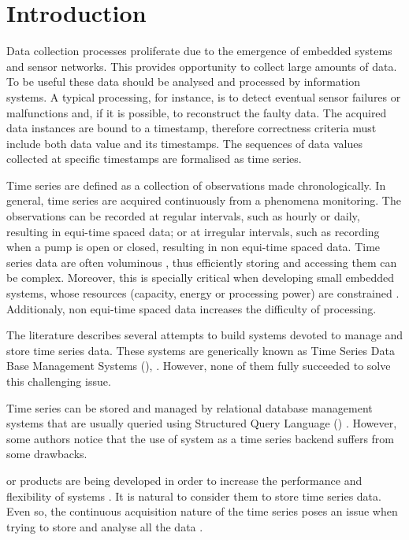 \section{Introduction}

Data collection processes proliferate due to the emergence of embedded
systems and sensor networks.  This provides opportunity to collect
large amounts of data. To be useful these data should be analysed and
processed by information systems. A typical processing, for instance,
is to detect eventual sensor failures or malfunctions and, if it is
possible, to reconstruct the faulty data. The acquired data instances
are bound to a timestamp, therefore correctness criteria must include
both data value and its timestamps. The sequences of data values
collected at specific timestamps are formalised as time series.

Time series are defined as a collection of observations made
chronologically.  In general, time series are acquired continuously
from a phenomena monitoring. The observations can be recorded at
regular intervals, such as hourly or daily, resulting in equi-time
spaced data; or at irregular intervals, such as recording when a pump
is open or closed, resulting in non equi-time spaced data. Time series
data are often voluminous \cite{fu11,keogh08:isax}, thus efficiently
storing and accessing them can be complex. Moreover, this is specially
critical when developing small embedded systems, whose resources
(capacity, energy or processing power) are constrained
\cite{yaogehrke02}.  Additionaly, non equi-time spaced data increases
the difficulty of processing.

The literature describes several attempts to build systems devoted to
manage and store time series data. These systems are generically known
as Time Series Data Base Management Systems (),
\cite{dreyer94,last01}. However, none of them fully succeeded to solve
this challenging issue.

Time series can be stored and managed by relational database
management systems that are usually queried using Structured Query
Language () .
%
However, some authors
\cite{dreyer94,schmidt95,stonebraker09:scidb,zhang11} notice that the
use of  system as a time series backend suffers from some
drawbacks.

 or  products are being developed in order to
increase the performance and flexibility of  systems
\cite{atzeni13:relational_model_dead,stonebraker10,stonebraker09:scidb,zhang11}.
%
It is natural to consider them to store time series data. Even so, the
continuous acquisition nature of the time series poses an issue when
trying to store and analyse all the data \cite{keogh97}.

